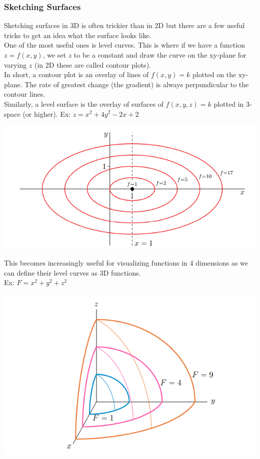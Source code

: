 \documentclass[11pt, fleqn]{article}
\begin{document}
\subsubsection{Sketching Surfaces}
Sketching surfaces in 3D is often trickier than in 2D but there are a few useful tricks to get an idea what the surface looks like.\\
One of the most useful ones is level curves. This is where if we have a function $z=f(x,y)$, we set $z$ to be a constant and draw the curve on the xy-plane for varying $z$ (in 2D these are called contour plots).\\
In short, a contour plot is an overlay of lines of $f(x,y)=k$ plotted on the xy-plane. The rate of greatest change (the gradient) is always perpundicular to the contour lines.\\
Similarly, a level surface is the overlay of surfaces of $f(x,y,z)=k$ plotted in 3-space (or higher).
Ex: $z=x^2+4y^2-2x+2$\\
\centerline{\includegraphics[scale=0.8]{Math217Pictures/contourPlot.png}}
This becomes increasingly useful for visualizing functions in 4 dimensions as we can define their level curves as 3D functions.\\
Ex: $F=x^2+y^2+z^2$\\
\centerline{\includegraphics[scale=0.8]{Math217Pictures/levelCurves.png}}
\end{document}

